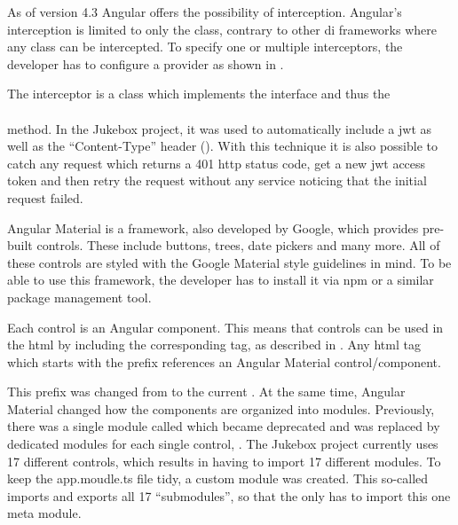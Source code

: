 
As of version 4.3 Angular offers the possibility of interception. Angular's interception is limited to only the  class, contrary to other \gls{di} frameworks where any class can be intercepted. To specify one or multiple interceptors, the developer has to configure a provider as shown in .


The interceptor is a class which implements the  interface and thus the \\ \hspace*{1cm}  \\ method. In the Jukebox project, it was used to automatically include a \gls{jwt} as well as the \enquote{Content-Type} header (). With this technique it is also possible to catch any request which returns a 401 \gls{http} status code, get a new \gls{jwt} access token and then retry the request without any service noticing that the initial request failed.




Angular Material is a framework, also developed by Google, which provides pre-built controls. These include buttons, trees, date pickers and many more. All of these controls are styled with the Google Material style guidelines in mind. To be able to use this framework, the developer has to install it via \gls{npm} or a similar package management tool. \cite{angularMaterial}

Each control is an Angular component. This means that controls can be used in the \gls{html} by including the corresponding tag, as described in . Any \gls{html} tag which starts with the  prefix references an Angular Material control/component.

This prefix was changed from  to the current . At the same time, Angular Material changed how the components are organized into modules. Previously, there was a single module called  which became deprecated and was replaced by dedicated modules for each single control, \zB {}. The Jukebox project currently uses 17 different controls, which results in having to import 17 different modules. To keep the app.moudle.ts file tidy, a custom module was created. This so-called  imports and exports all 17 \enquote{submodules}, so that the  only has to import this one meta module.

